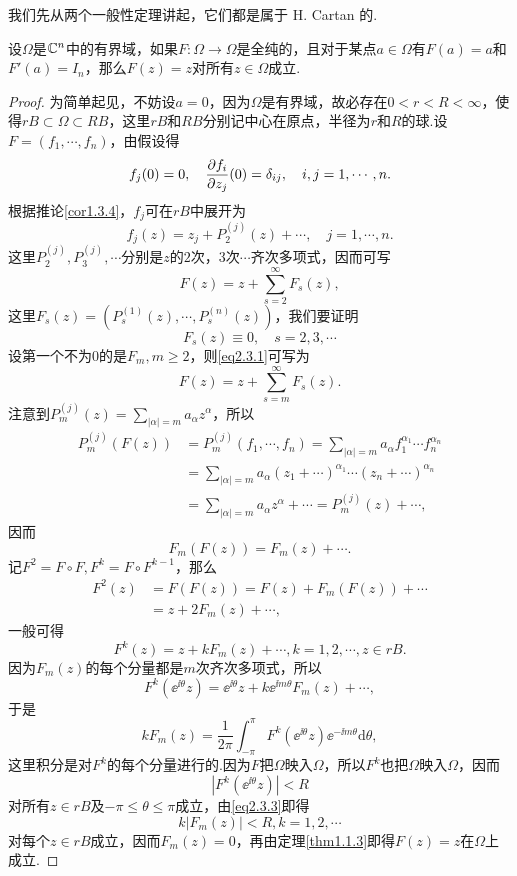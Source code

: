 我们先从两个一般性定理讲起，它们都是属于 H. Cartan 的.
\begin{theorem}\label{thm2.3.1}
	设$\Omega$是$\mathbb C^n$中的有界域，如果$F\colon\Omega\to\Omega$是全纯的，且对于某点$a\in\Omega$有$F(a)=a$和$F'(a)=I_n$，那么$F(z)=z$对所有$z\in\Omega$成立.
\end{theorem}
\begin{proof}
	为简单起见，不妨设$a=0$，因为$\Omega$是有界域，故必存在$0<r<R<\infty$，使得$rB\subset\Omega\subset RB$，这里$rB$和$RB$分别记中心在原点，半径为$r$和$R$的球.设$F=(f_1,\cdots,f_n)$，由假设得
	\[f_j(0)=0,\quad\frac{\partial f_i}{\partial z_j}(0)=\delta_{ij},\quad i,j=1,\cdots,n.\]
	根据推论\ref{cor1.3.4}，$f_j$可在$rB$中展开为
	\[f_j(z)=z_j+P_2^{(j)}(z)+\cdots,\quad j=1,\cdots,n.\]
	这里$P_2^{(j)},P_3^{(j)},\cdots$分别是$z$的$2$次，$3$次$\cdots$齐次多项式，因而可写
	\begin{equation}\label{eq2.3.1}
		F(z)=z+\sum_{s=2}^{\infty}F_s(z),
	\end{equation}
这里$F_s(z)=(P_s^{(1)}(z),\cdots,P_s^{(n)}(z))$，我们要证明
\[F_s(z)\equiv0,\quad s=2,3,\cdots\]
设第一个不为$0$的是$F_m,m\ge2$，则\eqref{eq2.3.1}可写为
\begin{equation}\label{eq2.3.2}
	F(z)=z+\sum_{s=m}^{\infty} F_s(z).
\end{equation}
注意到$P_m^{(j)}(z)=\sum\limits_{|\alpha|=m} a_\alpha z^\alpha$，所以
\begin{align*}
	P_m^{(j)}(F(z))
	&=P_m^{(j)}(f_1,\cdots,f_n)=\sum_{|\alpha|=m}a_\alpha f_1^{\alpha_1}\cdots f_n^{\alpha_n}\\
	&=\sum_{|\alpha|=m}a_\alpha(z_1+\cdots)^{\alpha_1}\cdots(z_n+\cdots)^{\alpha_n}\\
	&=\sum_{|\alpha|=m} a_\alpha z^\alpha +\cdots=P_m^{(j)}(z)+\cdots,
\end{align*}
因而
\[F_m(F(z))=F_m(z)+\cdots.\]
记\quad$F^2=F\circ F,F^k=F\circ F^{k-1}$，那么
\begin{align*}
	F^2(z)
	&=F(F(z))=F(z)+F_m(F(z))+\cdots\\
	&=z+2F_m(z)+\cdots,
\end{align*}
一般可得
\[F^k(z)=z+kF_m(z)+\cdots,k=1,2,\cdots,z\in rB.\]
因为$F_m(z)$的每个分量都是$m$次齐次多项式，所以
\[F^k(\ee^{\ii\theta}z)=\ee^{\ii\theta}z+k\ee^{\ii m\theta}F_m(z)+\cdots,\]
于是
\begin{equation}\label{eq2.3.3}
	kF_m(z)=\frac1{2\pi}\int_{-\pi}^{\pi} F^k(\ee^{\ii\theta}z)\ee^{-\ii m\theta}\mathrm{d}\theta,
\end{equation}
这里积分是对$F^k$的每个分量进行的.因为$F$把$\Omega$映入$\Omega$，所以$F^k$也把$\Omega$映入$\Omega$，因而
\[|F^k(\ee^{\ii\theta}z)|<R\]
对所有$z\in rB$及$-\pi\le\theta\le\pi$成立，由\eqref{eq2.3.3}即得
\[k|F_m(z)|<R,k=1,2,\cdots\]
对每个$z\in rB$成立，因而$F_m(z)=0$，再由定理\ref{thm1.1.3}即得$F(z)=z$在$\Omega$上成立.
\end{proof}
